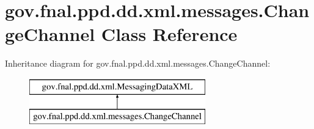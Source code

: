 \hypertarget{classgov_1_1fnal_1_1ppd_1_1dd_1_1xml_1_1messages_1_1ChangeChannel}{\section{gov.\-fnal.\-ppd.\-dd.\-xml.\-messages.\-Change\-Channel Class Reference}
\label{classgov_1_1fnal_1_1ppd_1_1dd_1_1xml_1_1messages_1_1ChangeChannel}
}
Inheritance diagram for gov.\-fnal.\-ppd.\-dd.\-xml.\-messages.\-Change\-Channel\-:\begin{figure}[H]
\begin{center}
\leavevmode
\includegraphics[height=2.000000cm]{classgov_1_1fnal_1_1ppd_1_1dd_1_1xml_1_1messages_1_1ChangeChannel}
\end{center}
\end{figure}
